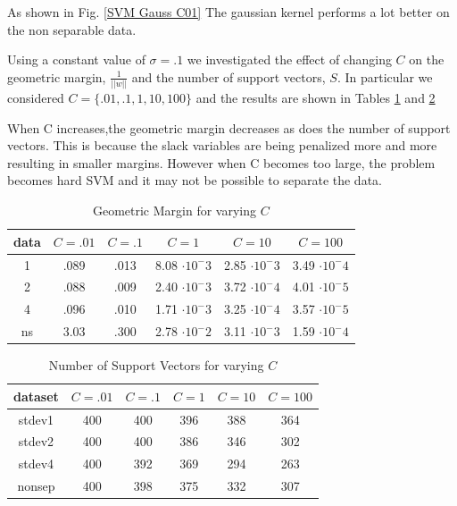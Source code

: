 \documentclass[12pt, twocolumn]{article}
\begin{document}
As shown in Fig. \ref{SVM Gauss C01} The gaussian kernel performs a lot better on the non separable data. 
       
 Using a constant value of $\sigma=.1$ we investigated the effect of changing $C$ on the geometric margin, $\frac{1}{||w||}$ and the number of support vectors, $S$. In particular we considered $C= \{.01, .1, 1, 10, 100 \}$
 and the  results are shown in Tables \ref{SVM Gauss Marg} and \ref{SVM Gauss S}
 

When C increases,the geometric margin decreases as does the number of support vectors. This is because the slack variables are being penalized more and more resulting in smaller margins. However when C becomes too large, the problem becomes hard SVM and it may not be possible to separate the data. 

 \begin{table}
 \tiny
 \caption{ Geometric Margin for varying $C$}
  \begin{tabular}{ | c | c | c | c | c | c| }
 \hline
 data& $C=.01$ & $C=.1$ & $C=1 $ & $C=10$ & $C=100$   \\ \hline 
 1 & .089 &  .013 & 8.08 $\cdot 10^-3$ & 2.85 $\cdot 10^-3$ & 3.49 $\cdot 10^-4$ \\ \hline
 2 & .088 & .009 & 2.40 $\cdot 10^-3$  & 3.72 $\cdot 10^-4$ & 4.01 $\cdot 10^-5$\\ \hline
 4 & .096 & .010 & 1.71 $\cdot 10^-3$  & 3.25 $\cdot 10^-4$ & 3.57 $\cdot 10^-5$\\ \hline 
 ns & 3.03 & .300 & 2.78 $\cdot 10^-2$  &  3.11 $\cdot 10^-3$ & 1.59 $\cdot 10^-4$\\ \hline
 \end{tabular}
 \label{SVM Gauss Marg}
\end{table}

\begin{table}
 \scriptsize
 \caption{ Number of Support Vectors for varying $C$}
  \begin{tabular}{ | c | c | c | c | c | c| }
 \hline
 dataset & $C=.01$ & $C=.1$ & $C=1 $ & $C=10$ & $C=100$   \\ \hline 
 stdev1 & 400  &  400 & 396 & 388 & 364  \\ \hline
 stdev2 & 400 & 400 & 386  & 346 & 302 \\ \hline
 stdev4 & 400 & 392 & 369 & 294 & 263 \\ \hline 
 nonsep & 400 & 398 & 375  &  332 & 307 \\ \hline
 \end{tabular}
 \label{SVM Gauss S}
\end{table}
\end{document}
